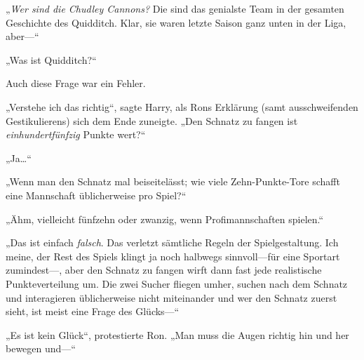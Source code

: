 „\emph{Wer sind die Chudley Cannons?} Die sind das genialste Team in der gesamten Geschichte des Quidditch. Klar, sie waren letzte Saison ganz unten in der Liga, aber—“

„Was ist Quidditch?“

Auch diese Frage war ein Fehler.

„Verstehe ich das richtig“, sagte Harry, als Rons Erklärung (samt ausschweifenden Gestikulierens) sich dem Ende zuneigte. „Den Schnatz zu fangen ist \emph{einhundertfünfzig} Punkte wert?“

„Ja…“

„Wenn man den Schnatz mal beiseitelässt; wie viele Zehn-Punkte-Tore schafft eine Mannschaft üblicherweise pro Spiel?“

„Ähm, vielleicht fünfzehn oder zwanzig, wenn Profimannschaften spielen.“

„Das ist einfach \emph{falsch}. Das verletzt sämtliche Regeln der Spielgestaltung. Ich meine, der Rest des Spiels klingt ja noch halbwegs sinnvoll—für eine Sportart zumindest—, aber den Schnatz zu fangen wirft dann fast jede realistische Punkteverteilung um. Die zwei Sucher fliegen umher, suchen nach dem Schnatz und interagieren üblicherweise nicht miteinander und wer den Schnatz zuerst sieht, ist meist eine Frage des Glücks—“

„Es ist kein Glück“, protestierte Ron. „Man muss die Augen richtig hin und her bewegen und—“

